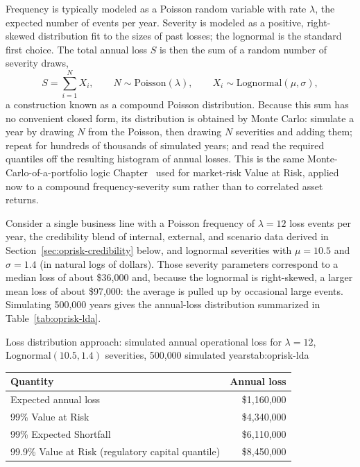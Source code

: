\documentclass[../ai_in_finance]{subfiles}
\begin{document}
Frequency is typically modeled as a Poisson random variable with rate $\lambda$, the expected number of events per year. Severity is modeled as a positive, right-skewed distribution fit to the sizes of past losses; the lognormal is the standard first choice. The total annual loss $S$ is then the sum of a random number of severity draws,
\begin{equation}
S = \sum_{i=1}^{N} X_i, \qquad N \sim \text{Poisson}(\lambda), \qquad X_i \sim \text{Lognormal}(\mu, \sigma),
\label{eq:oprisk-compound-poisson}
\end{equation}
a construction known as a compound Poisson distribution. Because this sum has no convenient closed form, its distribution is obtained by Monte Carlo: simulate a year by drawing $N$ from the Poisson, then drawing $N$ severities and adding them; repeat for hundreds of thousands of simulated years; and read the required quantiles off the resulting histogram of annual losses. This is the same Monte-Carlo-of-a-portfolio logic Chapter~ used for market-risk Value at Risk, applied now to a compound frequency-severity sum rather than to correlated asset returns.

\label{sec:oprisk-lda-worked}

Consider a single business line with a Poisson frequency of $\lambda = 12$ loss events per year, the credibility blend of internal, external, and scenario data derived in Section~\ref{sec:oprisk-credibility} below, and lognormal severities with $\mu = 10.5$ and $\sigma = 1.4$ (in natural logs of dollars). Those severity parameters correspond to a median loss of about \$36{,}000 and, because the lognormal is right-skewed, a larger mean loss of about \$97{,}000: the average is pulled up by occasional large events. Simulating 500{,}000 years gives the annual-loss distribution summarized in Table~\ref{tab:oprisk-lda}.

\begin{booktable}[htbp]{Loss distribution approach: simulated annual operational loss for $\lambda=12$, Lognormal$(10.5, 1.4)$ severities, 500{,}000 simulated years}{tab:oprisk-lda}
\begin{tabular}{lr}
\toprule
Quantity & Annual loss \\
\midrule
Expected annual loss & \$1{,}160{,}000 \\
99\% Value at Risk & \$4{,}340{,}000 \\
99\% Expected Shortfall & \$6{,}110{,}000 \\
99.9\% Value at Risk (regulatory capital quantile) & \$8{,}450{,}000 \\
\bottomrule
\end{tabular}
\end{booktable}
\end{document}
